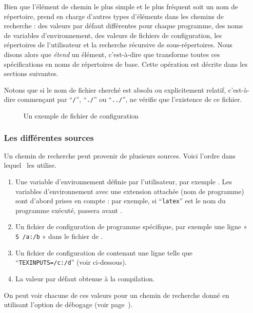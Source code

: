 \documentclass[german, english, french, 12pt]{article}
\renewcommand{\samp}[1]{\enquote{\texttt{#1}}}
\begin{document}
Bien que l'élément de chemin le plus simple et le plus fréquent soit un nom de
répertoire, \KPS{} prend en charge d'autres types d'éléments dans les chemins de
recherche : des valeurs par défaut différentes pour chaque programme, des noms
de variables d'environnement, des valeurs de fichiers de configuration, les
répertoires de l'utilisateur et la recherche récursive de sous-répertoires. Nous
disons alors que \KPS{} \emph{étend} un élément, c'est-à-dire que \KPS{}
transforme toutes ces spécifications en noms de répertoires de base. Cette
opération est décrite dans les sections suivantes.

Notons que si le nom de fichier cherché est absolu ou explicitement relatif,
c'est-à-dire commençant par \samp{/}, \samp{./} ou \samp{../}, \KPS{} ne vérifie
que l'existence de ce fichier.  \ifSingleColumn \else
\begin{figure*}
  \centering  \setlength{\abovecaptionskip}{0pt}
  \caption{Un exemple de fichier de configuration}
  \label{fig:config-sample}
\end{figure*}
\fi

\subsubsection{Les différentes sources}
\label{sec:path-sources}

Un chemin de recherche peut provenir de plusieurs sources. Voici l'ordre dans
lequel \KPS\ les utilise.

\begin{enumerate}
\item Une variable d'environnement définie par l'utilisateur, par exemple
  . Les variables d'environnement avec une extension attachée
  (nom de programme) sont d'abord prises en compte : par exemple, si
  \samp{latex} est le nom du programme exécuté, 
  passera avant .
\item Un fichier de configuration de programme spécifique, par exemple une ligne
  « \texttt{S /a:/b} » dans le fichier  de .
\item Un fichier de configuration  de \KPS{} contenant une ligne
  telle que \\ \samp{TEXINPUTS=/c:/d} (voir ci-dessous).
\item La valeur par défaut obtenue à la compilation.
\end{enumerate}
\noindent On peut voir chacune de ces valeurs pour un chemin de recherche donné
en utilisant l'option de débogage (voir page~\pageref{sec:debugging}).
\end{document}
